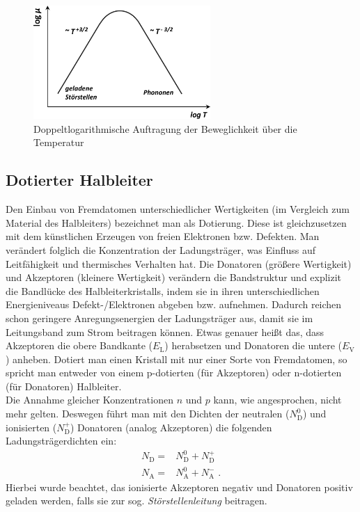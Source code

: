 \documentclass[numbers=noenddot,14pt,a4paper]{scrartcl}
\newcommand{\ix}[1]{_\text{#1}}
\newcommand{\tilt}[1]{\textit{#1}}
\begin{document}
\begin{figure}[H]
	\centering
	\includegraphics[width=0.6\textwidth]{beweglichkeit.png}
	\caption{Doppeltlogarithmische Auftragung der Beweglichkeit über die Temperatur}
	\label{img:beweglichkeit}
\end{figure}
\subsection{Dotierter Halbleiter}\label{ch:dot}
Den Einbau von Fremdatomen unterschiedlicher Wertigkeiten (im Vergleich zum Material des Halbleiters) bezeichnet man als Dotierung. Diese ist gleichzusetzen mit dem künstlichen Erzeugen von freien Elektronen bzw. Defekten. Man verändert folglich die Konzentration der Ladungsträger, was Einfluss auf Leitfähigkeit und thermisches Verhalten hat. Die Donatoren (größere Wertigkeit) und Akzeptoren (kleinere Wertigkeit) verändern die Bandstruktur und explizit die Bandlücke des Halbleiterkristalls, indem sie in ihren unterschiedlichen Energieniveaus Defekt-/Elektronen abgeben bzw. aufnehmen. Dadurch reichen schon geringere Anregungsenergien der Ladungsträger aus, damit sie im Leitungsband zum Strom beitragen können. Etwas genauer heißt das, dass Akzeptoren die obere Bandkante ($E\ix{L}$) herabsetzen und Donatoren die untere ($E\ix{V}$) anheben. Dotiert man einen Kristall mit nur einer Sorte von Fremdatomen, so spricht man entweder von einem p-dotierten (für Akzeptoren) oder n-dotierten (für Donatoren) Halbleiter.\\
Die Annahme gleicher Konzentrationen $n$ und $p$ kann, wie angesprochen, nicht mehr gelten. Deswegen führt man mit den Dichten der neutralen ($N\ix{D}^{0}$)  und ionisierten ($N\ix{D}^{+}$) Donatoren (analog Akzeptoren) die folgenden Ladungsträgerdichten ein:
\begin{align}
	N\ix{D}=&N\ix{D}^0+N\ix{D}^+ \label{eq:donator}\\
	N\ix{A}=&N\ix{A}^0+N\ix{A}^- \,\,.
\end{align}
Hierbei wurde beachtet, das ionisierte Akzeptoren negativ und Donatoren positiv geladen werden, falls sie zur sog. \tilt{Störstellenleitung} beitragen.\\
\end{document}
